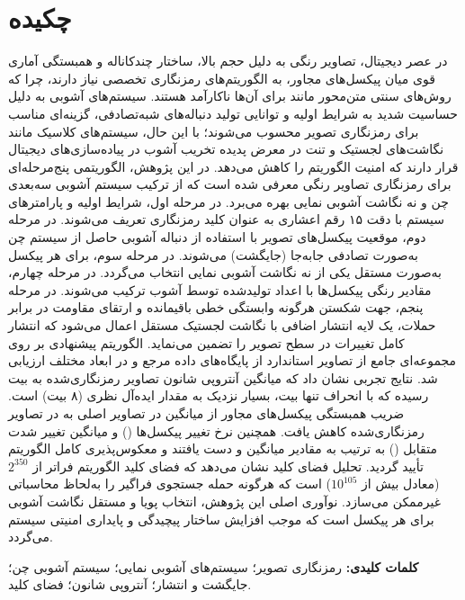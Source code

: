 
\chapter*{چکیده}
در عصر دیجیتال، تصاویر رنگی به دلیل حجم بالا، ساختار چندکاناله و همبستگی آماری قوی میان پیکسل‌های مجاور، به الگوریتم‌های رمزنگاری تخصصی نیاز دارند، چرا که روش‌های سنتی متن‌محور مانند  برای آن‌ها ناکارآمد هستند. سیستم‌های آشوبی به دلیل حساسیت شدید به شرایط اولیه و توانایی تولید دنباله‌های شبه‌تصادفی، گزینه‌ای مناسب برای رمزنگاری تصویر محسوب می‌شوند؛ با این حال، سیستم‌های کلاسیک مانند نگاشت‌های لجستیک و تنت در معرض پدیده تخریب آشوب در پیاده‌سازی‌های دیجیتال قرار دارند که امنیت الگوریتم را کاهش می‌دهد. در این پژوهش، الگوریتمی پنج‌مرحله‌ای برای رمزنگاری تصاویر رنگی معرفی شده است که از ترکیب سیستم آشوبی سه‌بعدی چن و نه نگاشت آشوبی نمایی بهره می‌برد. در مرحله اول، شرایط اولیه و پارامترهای سیستم با دقت ۱۵ رقم اعشاری به عنوان کلید رمزنگاری تعریف می‌شوند. در مرحله دوم، موقعیت پیکسل‌های تصویر با استفاده از دنباله آشوبی حاصل از سیستم چن به‌صورت تصادفی جابه‌جا (جایگشت) می‌شوند. در مرحله سوم، برای هر پیکسل به‌صورت مستقل یکی از نه نگاشت آشوبی نمایی انتخاب می‌گردد. در مرحله چهارم، مقادیر رنگی پیکسل‌ها با اعداد تولیدشده توسط آشوب ترکیب می‌شوند. در مرحله پنجم، جهت شکستن هرگونه وابستگی خطی باقیمانده و ارتقای مقاومت در برابر حملات، یک لایه انتشار اضافی با نگاشت لجستیک مستقل اعمال می‌شود که انتشار کامل تغییرات در سطح تصویر را تضمین می‌نماید. الگوریتم پیشنهادی بر روی مجموعه‌ای جامع از تصاویر استاندارد از پایگاه‌های داده مرجع  و  در ابعاد مختلف ارزیابی شد. نتایج تجربی نشان داد که میانگین آنتروپی شانون تصاویر رمزنگاری‌شده به  بیت رسیده که با انحراف تنها  بیت، بسیار نزدیک به مقدار ایده‌آل نظری (۸ بیت) است. ضریب همبستگی پیکسل‌های مجاور از میانگین  در تصاویر اصلی به  در تصاویر رمزنگاری‌شده کاهش یافت. همچنین نرخ تغییر پیکسل‌ها () و میانگین تغییر شدت متقابل () به ترتیب به مقادیر میانگین  و  دست یافتند و معکوس‌پذیری کامل الگوریتم تأیید گردید. تحلیل فضای کلید نشان می‌دهد که فضای کلید الگوریتم فراتر از $2^{350}$ (معادل بیش از $10^{105}$) است که هرگونه حمله جستجوی فراگیر را به‌لحاظ محاسباتی غیرممکن می‌سازد. نوآوری اصلی این پژوهش، انتخاب پویا و مستقل نگاشت آشوبی برای هر پیکسل است که موجب افزایش ساختار پیچیدگی و پایداری امنیتی سیستم می‌گردد.

\textbf{کلمات کلیدی:} رمزنگاری تصویر؛ سیستم‌های آشوبی نمایی؛ سیستم آشوبی چن؛ جایگشت و انتشار؛ آنتروپی شانون؛ فضای کلید.

\newpage